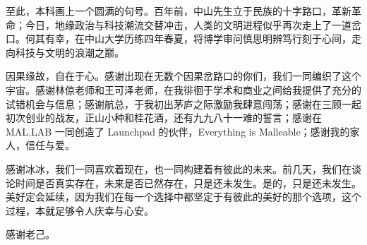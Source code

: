 
\begin{acknowledgements}

至此，本科画上一个圆满的句号。百年前，中山先生立于民族的十字路口，革新革命；今日，地缘政治与科技潮流交替冲击，人类的文明进程似乎再次走上了一道岔口。何其有幸，在中山大学历练四年春夏，将博学审问慎思明辨笃行刻于心间，走向科技与文明的浪潮之巅。

因果缘故，自在于心。感谢出现在无数个因果岔路口的你们，我们一同编织了这个宇宙。感谢林倞老师和王可泽老师，在我徘徊于学术和商业之间给我提供了充分的试错机会与信息；感谢航总，于我初出茅庐之际激励我肆意闯荡；感谢在三顾一起初次创业的战友，正山小种和桂花酒，还有九九八十一难的誓言；感谢在 MAL.LAB 一同创造了 Launchpad 的伙伴，Everything is Malleable；感谢我的家人，信任与爱。
    
感谢冰冰，我们一同喜欢着现在，也一同构建着有彼此的未来。前几天，我们在谈论时间是否真实存在，未来是否已然存在，只是还未发生。是的，只是还未发生。美好定会延续，因为我们在每一个选择中都坚定于有彼此的美好的那个选项，这个过程，本就足够令人庆幸与心安。
    
感谢老己。

\end{acknowledgements}

